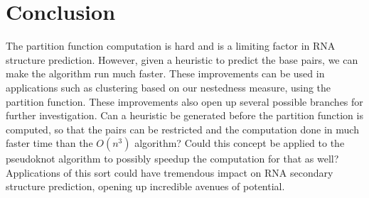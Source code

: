 

\section{Conclusion}

The partition function computation is hard and is a limiting factor in
RNA structure prediction. However, given a heuristic to predict the
base pairs, we can make the algorithm run much faster. These
improvements can be used in applications such as clustering based on
our nestedness measure, using the partition function. These
improvements also open up several possible branches for further
investigation. Can a heuristic be generated before the partition
function is computed, so that the pairs can be restricted and the
computation done in much faster time than the $O(n^3)$ algorithm?
Could this concept be applied to the pseudoknot algorithm to possibly
speedup the computation for that as well? Applications of this sort
could have tremendous impact on RNA secondary structure prediction,
opening up incredible avenues of potential.

